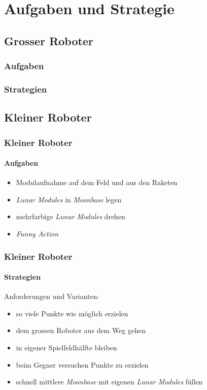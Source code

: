 \section{Aufgaben und Strategie}
\subsection{Grosser Roboter}

\begin{frame}
	\frametitle{Aufgaben}
	
\end{frame}

\begin{frame}
	\frametitle{Strategien}
	
\end{frame}

\subsection{Kleiner Roboter}

\begin{frame}
	\frametitle{Kleiner Roboter}
	\framesubtitle{Aufgaben}
	\begin{itemize}
		\item Modulaufnahme auf dem Feld und aus den Raketen
		\item \textit{Lunar Modules} in \textit{Moonbase} legen
		\item mehrfarbige \textit{Lunar Modules} drehen
		\item \textit{Funny Action}
	\end{itemize}
\end{frame}

\begin{frame}
	\frametitle{Kleiner Roboter}
	\framesubtitle{Strategien}
	Anforderungen und Varianten:
	\begin{itemize}
		\item so viele Punkte wie möglich erzielen
		\item dem grossen Roboter aus dem Weg gehen
	\end{itemize}
	\begin{itemize}
		\item in eigener Spielfeldhälfte bleiben
		\item beim Gegner versuchen Punkte zu erzielen
		\item schnell mittlere \textit{Moonbase} mit eigenen \textit{Lunar Modules} füllen
	\end{itemize}
	
\end{frame}
